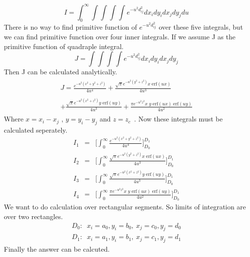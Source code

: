\documentclass[twoside,twocolumn]{article}
\begin{document}
\begin{equation}
\label {eq10}
I = \int_0^{\infty}\int \int \int \int e^{-u^2 d_{ij}^2} dx_i dy_i dx_j dy_j du
\end{equation}
There is no way to find primitive function of $e^{-u^2 d_{ij}^2}$ over these five integrals, but we can find primitive function over four inner integrals. If we assume J as the primitive function of quadraple integral.
\begin{equation}
\label {eq11}
J = \int \int \int \int e^{-u^2 d_{ij}^2 } dx_i dy_i dx_j dy_j  
\end{equation}
Then J can be calculated analytically.
\begin{eqnarray}\label {eq12}
\begin{array}{lll}

J = \frac{e^{-u^2(x^2+y^2+z^2)}}{4u^4}+\frac{\sqrt{\pi}e^{-u^2(y^2 + z^2)}x\; \mathrm{erf}(u x)}{4u^3}\\ \\
+\frac{\sqrt{\pi}e^{-u^2(x^2 + z^2)}y\; \mathrm {erf}(u y)}{4u^3}+\frac{\pi e^{-u^2 z^2}x\;y\; \mathrm{erf}(u x)\; \mathrm{erf}(u y)}{4u^2}
\end{array}
\end{eqnarray}
Where $x = x_i - x_j$ , $y = y_i - y_j$ and $z = z_c$\ . 
Now these integrals must be calculated seperately.
\begin{equation}\label {eq13}
\begin{array}{lll}

I_1& = &\big[\int_0^{\infty}\frac{e^{-u^2(x^2+y^2+z^2)}}{4u^4}\big]_{D_0}^{D_1}\\
I_2& = &\big[\int_0^{\infty}\frac{\sqrt{\pi}e^{-u^2(y^2 + z^2)}x\; \mathrm{erf}(u x)}{4u^3}\big]_{D_0}^{D_1}\\ 
I_3& = &\big[\int_0^{\infty}\frac{\sqrt{\pi}e^{-u^2(x^2 + z^2)}y\; \mathrm {erf}(u y)}{4u^3}\big]_{D_0}^{D_1}\\
I_4& = &\big[\int_0^{\infty}\frac{\pi e^{-u^2 z^2}x\;y\; \mathrm{erf}(u x)\; \mathrm{erf}(u y)}{4u^2}\big]_{D_0}^{D_1}
\end{array}
\end{equation}
We want to do calculation over rectangular segments. So limits of integration are over two rectangles.
\begin{eqnarray}\label {eq14}
D_0:\;\;x_i=a_0, y_i = b_0,\ x_j = c_0,y_j = d_0\nonumber\\
D_1:\;\;x_i=a_1, y_i = b_1, \ x_j = c_1,y_j = d_1
\end{eqnarray}
Finally the answer can be calcuted.
\end{document}
